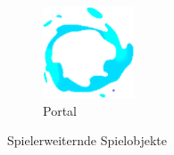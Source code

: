 \begin{figure}[H]
\begin{subfigure}[H]{0.15\textwidth}
        \includegraphics[width=\textwidth]{img/realisierung/assets/portal}
        \caption{Portal}
        \label{fig:portal}
    \end{subfigure}
    \caption{Spielerweiternde Spielobjekte}
    \label{fig:barriereandportal}
\end{figure}

\newpage
